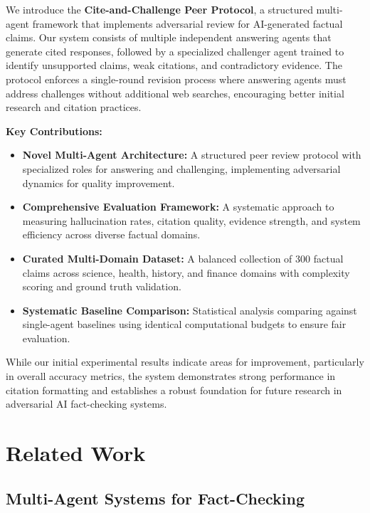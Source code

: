 \documentclass[11pt,a4paper]{article}
\begin{document}
We introduce the \textbf{Cite-and-Challenge Peer Protocol}, a structured multi-agent framework that implements adversarial review for AI-generated factual claims. Our system consists of multiple independent answering agents that generate cited responses, followed by a specialized challenger agent trained to identify unsupported claims, weak citations, and contradictory evidence. The protocol enforces a single-round revision process where answering agents must address challenges without additional web searches, encouraging better initial research and citation practices.

\textbf{Key Contributions:}

\begin{itemize}
    \item \textbf{Novel Multi-Agent Architecture:} A structured peer review protocol with specialized roles for answering and challenging, implementing adversarial dynamics for quality improvement.
    
    \item \textbf{Comprehensive Evaluation Framework:} A systematic approach to measuring hallucination rates, citation quality, evidence strength, and system efficiency across diverse factual domains.
    
    \item \textbf{Curated Multi-Domain Dataset:} A balanced collection of 300 factual claims across science, health, history, and finance domains with complexity scoring and ground truth validation.
    
    \item \textbf{Systematic Baseline Comparison:} Statistical analysis comparing against single-agent baselines using identical computational budgets to ensure fair evaluation.
\end{itemize}

While our initial experimental results indicate areas for improvement, particularly in overall accuracy metrics, the system demonstrates strong performance in citation formatting and establishes a robust foundation for future research in adversarial AI fact-checking systems.

\section{Related Work}

\subsection{Multi-Agent Systems for Fact-Checking}
\end{document}
